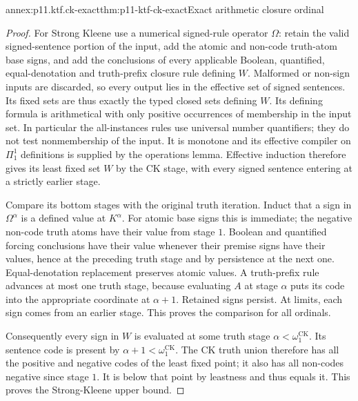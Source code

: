 \begin{annexitem}{annex:p11.ktf.ck-exact}{thm:p11-ktf-ck-exact}{Exact arithmetic closure ordinal}
\begin{proof}
For Strong Kleene use a numerical signed-rule operator
\(\Omega\): retain the valid signed-sentence portion of the input,
add the atomic and non-code
truth-atom base signs, and add the conclusions of every applicable
Boolean, quantified, equal-denotation and truth-prefix closure rule
defining \(W\). Malformed or non-sign inputs are discarded, so
every output lies in the effective set of signed sentences. Its
fixed sets are thus exactly the typed closed sets defining \(W\).
Its defining formula is arithmetical with only
positive occurrences of membership in the input set. In particular
the all-instances rules use universal number quantifiers; they do
not test nonmembership of the input. It is monotone and its effective compiler
on \(\Pi^1_1\) definitions is supplied by the operations lemma.
Effective induction therefore gives its least fixed
set \(W\) by the CK stage, with every signed sentence entering
at a strictly earlier stage.

Compare its bottom stages with the original truth iteration.
Induct that a sign in \(\Omega^\alpha\) is a defined value at
\(K^\alpha\). For atomic base signs this is immediate; the
negative non-code truth atoms have their value from stage \(1\).
Boolean and quantified forcing conclusions have their value whenever
their premise signs have their values, hence at the preceding truth
stage and by persistence at the next one. Equal-denotation replacement
preserves atomic values. A truth-prefix rule advances at most one
truth stage, because evaluating \(A\) at stage \(\alpha\)
puts its code into the appropriate coordinate at \(\alpha+1\).
Retained signs persist. At limits, each sign comes from an earlier
stage. This proves the comparison for all ordinals.

Consequently every sign in \(W\) is evaluated at some truth stage
\(\alpha<\omega_1^{\mathrm{CK}}\). Its sentence code is present
by \(\alpha+1<\omega_1^{\mathrm{CK}}\). The CK truth union
therefore has all the positive and negative codes of the least fixed
point; it also has all non-codes negative since stage \(1\). It is
below that point by leastness and thus equals it. This proves the
Strong-Kleene upper bound.


\end{proof}
\end{annexitem}
